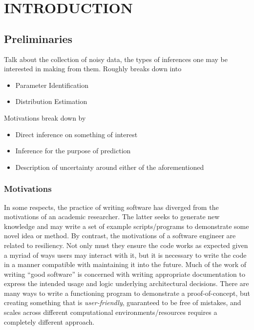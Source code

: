 \chapter{\uppercase{Introduction}} \label{chapter:01}

\section{Preliminaries}
Talk about the collection of noisy data, the types of inferences one may be interested in making from them.
Roughly breaks down into 
\begin{itemize}
  \item Parameter Identification
  \item Distribution Estimation
\end{itemize}

Motivations break down by

\begin{itemize}
  \item Direct inference on something of interest
  \item Inference for the purpose of prediction
  \item Description of uncertainty around either of the aforementioned
\end{itemize}

\subsection{Motivations}\label{sec:motivations}
In some respects, the practice of writing software has diverged from the motivations of an academic researcher.
The latter seeks to generate new knowledge and may write a set of example scripts/programs to demonstrate some novel idea or method.
By contrast, the motivations of a software engineer are related to resiliency.
Not only must they ensure the code works as expected given a myriad of ways users may interact with it, but it is necessary to write the code in a manner compatible with maintaining it into the future.
Much of the work of writing ``good software'' is concerned with writing appropriate documentation to express the intended usage and logic underlying architectural decisions.
There are many ways to write a functioning program to demonstrate a proof-of-concept, but creating something that is \emph{user-friendly}, guaranteed to be free of mistakes, and scales across different computational environments/resources requires a completely different approach.

